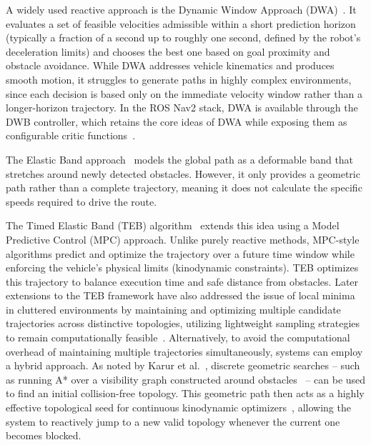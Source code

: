 A widely used reactive approach is the Dynamic Window Approach (DWA)~\cite{fox1997dwa}. It evaluates a set of feasible velocities admissible within a short prediction horizon (typically a fraction of a second up to roughly one second, defined by the robot's deceleration limits) and chooses the best one based on goal proximity and obstacle avoidance. 
While DWA addresses vehicle kinematics and produces smooth motion, it struggles to generate paths in highly complex environments, since each decision is based only on the immediate velocity window rather than a longer-horizon trajectory. In the ROS Nav2 stack, DWA is available through the DWB controller, which retains the core ideas of DWA while exposing them as configurable critic functions~\cite{nav2_docs}.

The Elastic Band approach~\cite{quinlan1993elastic} models the global path as a deformable band that stretches around newly detected obstacles. However, it only provides a geometric path rather than a complete trajectory, meaning it does not calculate the specific speeds required to drive the route.

The Timed Elastic Band (TEB) algorithm~\cite{rosmann2012teb} extends this idea using a Model Predictive Control (MPC) approach. Unlike purely reactive methods, MPC-style algorithms predict and optimize the trajectory over a future time window while enforcing the vehicle's physical limits (kinodynamic constraints). TEB optimizes this trajectory to balance execution time and safe distance from obstacles. Later extensions to the TEB framework have also addressed the issue of local minima in cluttered environments by maintaining and optimizing multiple candidate trajectories across distinctive topologies, utilizing lightweight sampling strategies to remain computationally feasible~\cite{rossman2017teb}. Alternatively, to avoid the computational overhead of maintaining multiple trajectories simultaneously, systems can employ a hybrid approach. As noted by Karur et al.~\cite{karur2021survey}, discrete geometric searches -- such as running A* over a visibility graph constructed around obstacles~\cite{lavalle2006planning} -- can be used to find an initial collision-free topology. This geometric path then acts as a highly effective topological seed for continuous kinodynamic optimizers~\cite{sedighi2019guided}, allowing the system to reactively jump to a new valid topology whenever the current one becomes blocked.


